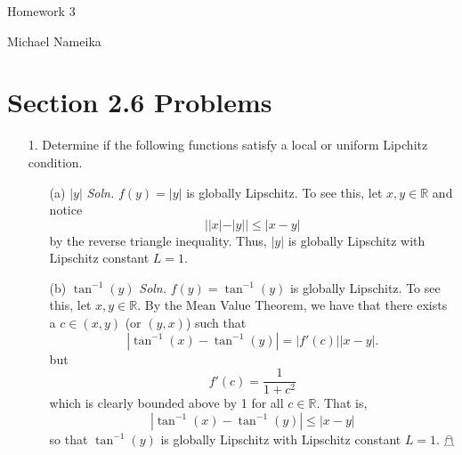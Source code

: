 \documentclass{article}
\begin{document}
\begin{center}
    {\Huge Homework 3}
    \vspace{0.5cm}

    {\Large Michael Nameika}
\end{center}

\section*{Section 2.6 Problems}
\begin{itemize}
    \item[1.] Determine if the following functions satisfy a local or uniform Lipchitz condition.
    \begin{itemize}
        \item[(a)] $|y|$
        \newline\newline
        \textit{Soln.} $f(y) = |y|$ is globally Lipschitz. To see this, let $x,y \in \mathbb{R}$ and notice
        \[||x| - |y|| \leq |x - y|\]
        by the reverse triangle inequality. Thus, $|y|$ is globally Lipschitz with Lipschitz constant $L = 1$.
        
        \item[(b)] $\tan^{-1}(y)$
        \newline\newline
        \textit{Soln.} $f(y) = \tan^{-1}(y)$ is globally Lipschitz. To see this, let $x,y \in \mathbb{R}$. By the Mean Value Theorem, we have that there exists a $c \in (x,y)$ (or $(y,x)$) such that
        \[|\tan^{-1}(x) - \tan^{-1}(y)| = |f'(c)||x - y|.\]
        but 
        \[f'(c) = \frac{1}{1 + c^2}\]
        which is clearly bounded above by 1 for all $c \in \mathbb{R}$. That is,
        \[|\tan^{-1}(x) - \tan^{-1}(y)| \leq |x - y|\]
        so that $\tan^{-1}(y)$ is globally Lipschitz with Lipschitz constant $L = 1$. \hfill $\mathghost$
        


\end{itemize}
\end{itemize}
\end{document}
